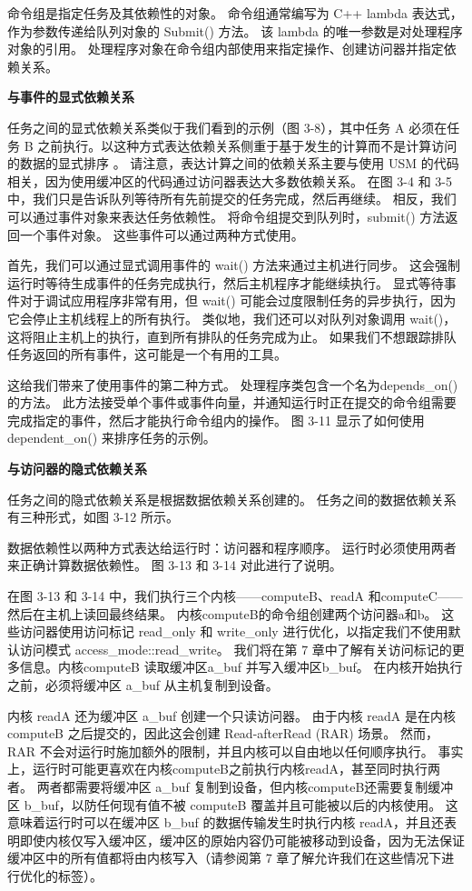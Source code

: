 命令组是指定任务及其依赖性的对象。 命令组通常编写为 C++ lambda 表达式，作为参数传递给队列对象的 Submit() 方法。 该 lambda 的唯一参数是对处理程序对象的引用。 处理程序对象在命令组内部使用来指定操作、创建访问器并指定依赖关系。

\textbf{与事件的显式依赖关系}

任务之间的显式依赖关系类似于我们看到的示例（图 3-8），其中任务 A 必须在任务 B 之前执行。以这种方式表达依赖关系侧重于基于发生的计算而不是计算访问的数据的显式排序 。 请注意，表达计算之间的依赖关系主要与使用 USM 的代码相关，因为使用缓冲区的代码通过访问器表达大多数依赖关系。 在图 3-4 和 3-5 中，我们只是告诉队列等待所有先前提交的任务完成，然后再继续。 相反，我们可以通过事件对象来表达任务依赖性。 将命令组提交到队列时，submit() 方法返回一个事件对象。 这些事件可以通过两种方式使用。

首先，我们可以通过显式调用事件的 wait() 方法来通过主机进行同步。 这会强制运行时等待生成事件的任务完成执行，然后主机程序才能继续执行。 显式等待事件对于调试应用程序非常有用，但 wait() 可能会过度限制任务的异步执行，因为它会停止主机线程上的所有执行。 类似地，我们还可以对队列对象调用 wait()，这将阻止主机上的执行，直到所有排队的任务完成为止。 如果我们不想跟踪排队任务返回的所有事件，这可能是一个有用的工具。

这给我们带来了使用事件的第二种方式。 处理程序类包含一个名为depends\_on() 的方法。 此方法接受单个事件或事件向量，并通知运行时正在提交的命令组需要完成指定的事件，然后才能执行命令组内的操作。 图 3-11 显示了如何使用 dependent\_on() 来排序任务的示例。

\textbf{与访问器的隐式依赖关系}

任务之间的隐式依赖关系是根据数据依赖关系创建的。 任务之间的数据依赖关系有三种形式，如图 3-12 所示。

数据依赖性以两种方式表达给运行时：访问器和程序顺序。 运行时必须使用两者来正确计算数据依赖性。 图 3-13 和 3-14 对此进行了说明。

在图 3-13 和 3-14 中，我们执行三个内核——computeB、readA 和computeC——然后在主机上读回最终结果。 内核computeB的命令组创建两个访问器a和b。 这些访问器使用访问标记 read\_only 和 write\_only 进行优化，以指定我们不使用默认访问模式 access\_mode::read\_write。 我们将在第 7 章中了解有关访问标记的更多信息。内核computeB 读取缓冲区a\_buf 并写入缓冲区b\_buf。 在内核开始执行之前，必须将缓冲区 a\_buf 从主机复制到设备。

内核 readA 还为缓冲区 a\_buf 创建一个只读访问器。 由于内核 readA 是在内核computeB 之后提交的，因此这会创建 Read-afterRead (RAR) 场景。 然而，RAR 不会对运行时施加额外的限制，并且内核可以自由地以任何顺序执行。 事实上，运行时可能更喜欢在内核computeB之前执行内核readA，甚至同时执行两者。 两者都需要将缓冲区 a\_buf 复制到设备，但内核computeB还需要复制缓冲区 b\_buf，以防任何现有值不被 computeB 覆盖并且可能被以后的内核使用。 这意味着运行时可以在缓冲区 b\_buf 的数据传输发生时执行内核 readA，并且还表明即使内核仅写入缓冲区，缓冲区的原始内容仍可能被移动到设备，因为无法保证 缓冲区中的所有值都将由内核写入（请参阅第 7 章了解允许我们在这些情况下进行优化的标签）。


